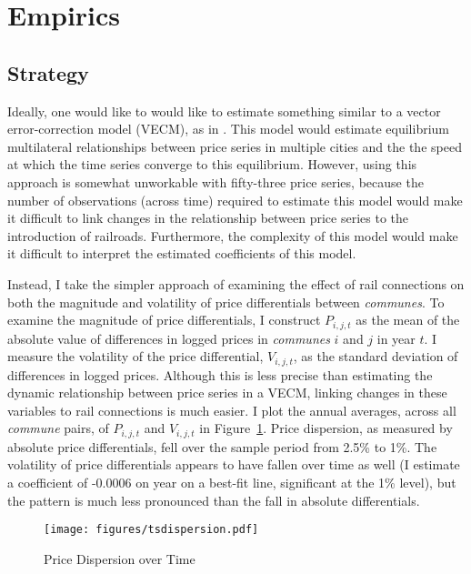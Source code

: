 \documentclass[12pt,twoside]{article}
\begin{document}
\section{Empirics}

\subsection{Strategy}

Ideally, one would like to would like to estimate something similar to a vector error-correction model (VECM), as in \cite{johansen}.
This model would estimate equilibrium multilateral relationships between price series in multiple cities and the the speed at which the time series converge to this equilibrium.
However, using this approach is somewhat unworkable with fifty-three price series, because the number of observations (across time) required to estimate this model would make it difficult to link changes in the relationship between price series to the introduction of railroads.
Furthermore, the complexity of this model would make it difficult to interpret the estimated coefficients of this model.

Instead, I take the simpler approach of examining the effect of rail connections on both the magnitude and volatility of price differentials between \emph{communes}.
To examine the magnitude of price differentials, I construct $P_{i,j,t}$ as the mean of the absolute value of differences in logged prices in \emph{communes} $i$ and $j$ in year $t$.
I measure the volatility of the price differential, $V_{i,j,t}$, as the standard deviation of differences in logged prices.
Although this is less precise than estimating the dynamic relationship between price series in a VECM, linking changes in these variables to rail connections is much easier.
I plot the annual averages, across all \emph{commune} pairs, of $P_{i,j,t}$ and $V_{i,j,t}$ in Figure~\ref{fig:tsdifferentials}.
Price dispersion, as measured by absolute price differentials, fell over the sample period from 2.5\% to 1\%.
The volatility of price differentials appears to have fallen over time as well (I estimate a coefficient of -0.0006 on year on a best-fit line, significant at the 1\% level), but the pattern is much less pronounced than the fall in absolute differentials.

\begin{figure}[ht]
	\caption{Price Dispersion over Time}
	\texttt{[image: figures/tsdispersion.pdf]}
	\label{fig:tsdifferentials}
\end{figure}
\end{document}
